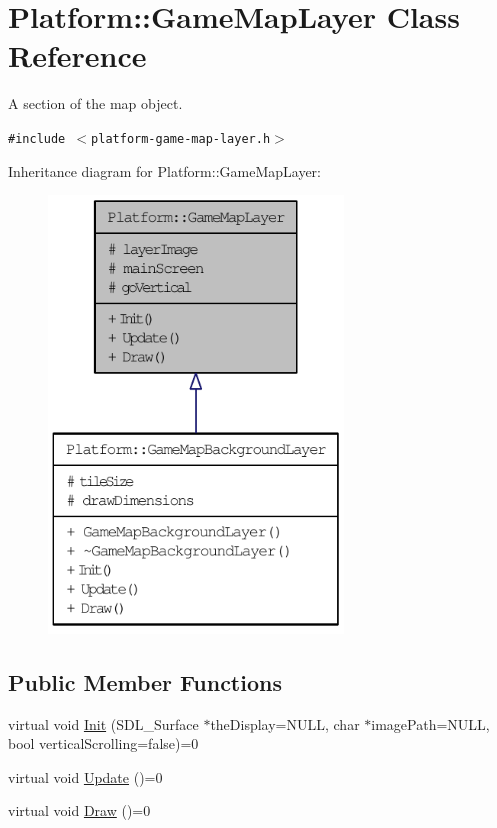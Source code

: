 \hypertarget{class_platform_1_1_game_map_layer}{
\section{Platform::GameMapLayer Class Reference}
\label{d8/d53/class_platform_1_1_game_map_layer}
}
A section of the map object.  


{\tt \#include $<$platform-game-map-layer.h$>$}

Inheritance diagram for Platform::GameMapLayer:\nopagebreak
\begin{figure}[H]
\begin{center}
\leavevmode
\includegraphics[width=222pt]{d8/dbc/class_platform_1_1_game_map_layer__inherit__graph}
\end{center}
\end{figure}
\subsection*{Public Member Functions}
\begin{CompactItemize}
\item 
virtual void \hyperlink{class_platform_1_1_game_map_layer_a25bd5a4d69574dfb3cefdd544e36e8d}{Init} (SDL\_\-Surface $\ast$theDisplay=NULL, char $\ast$imagePath=NULL, bool verticalScrolling=false)=0
\item 
virtual void \hyperlink{class_platform_1_1_game_map_layer_80631a9be3fb03f96ca3565c8860f077}{Update} ()=0
\item 
virtual void \hyperlink{class_platform_1_1_game_map_layer_cc44f193d8cf01e97fe34cb7da72e640}{Draw} ()=0
\end{CompactItemize}
